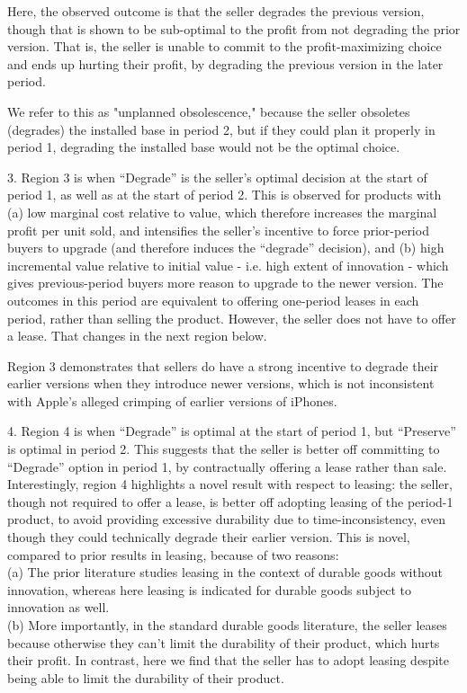 \documentclass[isre,blindrev]{informs3} %
\begin{document}
Here, the observed outcome is that the seller degrades the previous version, though that is shown to be sub-optimal to the profit from not degrading
the prior version. That is, the seller is unable to commit to the profit-maximizing choice and ends up hurting their profit, by degrading the previous
version in the later period. 

We refer to this as "unplanned obsolescence," because the seller obsoletes (degrades) the installed base in period 2, but if they could plan it properly in period 1, degrading the installed base would not be the optimal choice.

3. Region 3 is when {``}Degrade{''} is the seller{'}s optimal decision at the start of period 1, as well as at the start of period 2. This is observed
for products with (a) low marginal cost relative to value, which therefore increases the marginal profit per unit sold, and intensifies the seller{'}s
incentive to force prior-period buyers to upgrade (and therefore induces the {``}degrade{''} decision), and (b) high incremental value relative to
initial value - i.e. high extent of innovation - which gives previous-period buyers more reason to upgrade to the newer version. The outcomes in this period are equivalent to offering one-period leases in each period, rather than selling the product. However, the seller does not have to offer a lease. That changes in the next region below.

Region 3 demonstrates that sellers do have a strong incentive to degrade their earlier versions when they introduce newer versions, which is not
inconsistent with Apple{'}s alleged crimping of earlier versions of iPhones.

4. Region 4 is when {``}Degrade{''} is optimal at the start of period 1, but {``}Preserve{''} is optimal in period 2. This suggests that the seller
is better off committing to {``}Degrade{''} option in period 1, by contractually offering a lease rather than sale. Interestingly, region 4 highlights a novel result with respect to leasing: the seller, though not required to offer a lease, is better off adopting leasing of the period-1 product, to avoid providing excessive durability due to time-inconsistency, even though they could technically degrade their earlier version. This is novel, compared to prior results in leasing, because of two reasons:
\\
(a) The prior literature studies leasing in the context of durable goods without innovation, whereas here leasing is indicated for durable goods
subject to innovation as well. \\
(b) More importantly, in the standard durable goods literature, the seller leases because otherwise they can{'}t limit the durability of their product, which hurts their profit. In contrast, here we find that the seller has to adopt leasing despite being able to limit the durability of their product.
\end{document}
